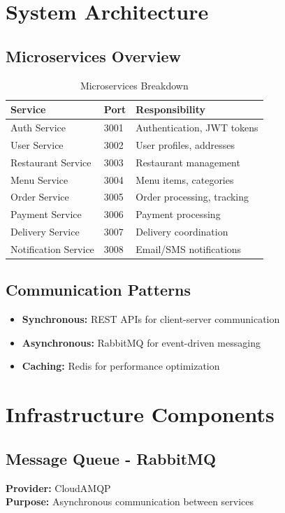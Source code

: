 \documentclass[12pt,a4paper]{article}
\begin{document}
\section{System Architecture}

\subsection{Microservices Overview}

\begin{table}[h]
\centering
\begin{tabular}{@{}lll@{}}
\toprule
\textbf{Service} & \textbf{Port} & \textbf{Responsibility} \\ \midrule
Auth Service & 3001 & Authentication, JWT tokens \\
User Service & 3002 & User profiles, addresses \\
Restaurant Service & 3003 & Restaurant management \\
Menu Service & 3004 & Menu items, categories \\
Order Service & 3005 & Order processing, tracking \\
Payment Service & 3006 & Payment processing \\
Delivery Service & 3007 & Delivery coordination \\
Notification Service & 3008 & Email/SMS notifications \\ \bottomrule
\end{tabular}
\caption{Microservices Breakdown}
\end{table}

\subsection{Communication Patterns}
\begin{itemize}
    \item \textbf{Synchronous:} REST APIs for client-server communication
    \item \textbf{Asynchronous:} RabbitMQ for event-driven messaging
    \item \textbf{Caching:} Redis for performance optimization
\end{itemize}

\section{Infrastructure Components}

\subsection{Message Queue - RabbitMQ}
\textbf{Provider:} CloudAMQP \\
\textbf{Purpose:} Asynchronous communication between services
\end{document}
